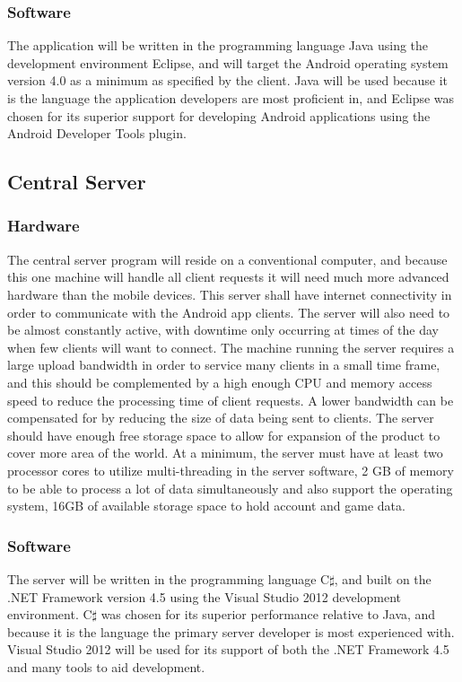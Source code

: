 		\subsubsection{Software}
			The application will be written in the programming language Java 
			using the development environment Eclipse, and will target the 
			Android operating system version 4.0 as a minimum as specified by 
			the client. Java will be used because it is the language the
			application developers are most proficient in, and Eclipse was
			chosen for its superior support for developing Android applications
			using the Android Developer Tools plugin.
	\subsection{Central Server}
		\subsubsection{Hardware}
			The central server program will reside on a conventional computer, 
			and because this one machine will handle all client requests it 
			will need much more advanced hardware than the mobile devices. 
			This server shall have internet connectivity in order to 
			communicate with the Android app clients. The server will also 
			need to be almost constantly active, with downtime only occurring 
			at times of the day when few clients will want to connect. The 
			machine running the server requires a large upload bandwidth in 
			order to service many clients in a small time frame, and this 
			should be complemented by a high enough CPU and memory access 
			speed to reduce the processing time of client requests. A lower 
			bandwidth can be compensated for by reducing the size of data 
			being sent to clients. The server should have enough free storage 
			space to allow for expansion of the product to cover more area of 
			the world. At a minimum, the server must have at least two
			processor cores to utilize multi-threading in the server software,
			2 GB of memory to be able to process a lot of data simultaneously 
			and also support the operating system, 16GB of available storage
			space to hold account and game data.

		\subsubsection{Software}
			The server will be written in the programming language C$\sharp$, 
			and built on the .NET Framework version 4.5 using the Visual 
			Studio 2012 development environment. C$\sharp$ was chosen for its 
			superior performance relative to Java, and because it is the 
			language the primary server developer is most experienced with.
			Visual Studio 2012 will be used for its support of both the .NET
			Framework 4.5 and many tools to aid development.

